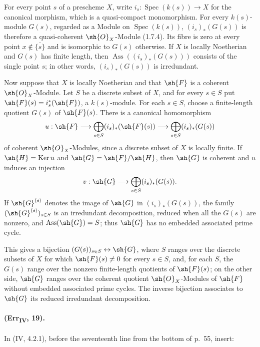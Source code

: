 \begin{remark}[3.2.9]
For every point $s$ of a prescheme $X$, write
$i_s:\operatorname{Spec}(k(s))\to X$ for the canonical morphism, which
is a quasi-compact monomorphism.  For every $k(s)$-module $G(s)$,
regarded as a Module on $\operatorname{Spec}(k(s))$,
$(i_s)_*(G(s))$ is therefore a quasi-coherent $\sh{O}_X$-Module
(1.7.4).  Its fibre is zero at every point
$x\notin\overline{\{s\}}$ and is isomorphic to $G(s)$ otherwise.  If
$X$ is locally Noetherian and $G(s)$ has finite length, then
$\operatorname{Ass}((i_s)_*(G(s)))$ consists of the single point $s$;
in other words, $(i_s)_*(G(s))$ is irredundant.

Now suppose that $X$ is locally Noetherian and that $\sh{F}$ is a
coherent $\sh{O}_X$-Module.  Let $S$ be a discrete subset of $X$, and
for every $s\in S$ put $\sh{F}(s)=i_s^*(\sh{F})$, a $k(s)$-module.
For each $s\in S$, choose a finite-length quotient $G(s)$ of
$\sh{F}(s)$.  There is a canonical homomorphism
\[
 u:\sh{F}\longrightarrow
 \bigoplus_{s\in S}(i_s)_*(\sh{F}(s))\longrightarrow
 \bigoplus_{s\in S}(i_s)_*(G(s))
\]
of coherent $\sh{O}_X$-Modules, since a discrete subset of $X$ is
locally finite.  If $\sh{H}=\operatorname{Ker}u$ and
$\sh{G}=\sh{F}/\sh{H}$, then $\sh{G}$ is coherent and $u$ induces an
injection
\[
 v:\sh{G}\longrightarrow\bigoplus_{s\in S}(i_s)_*(G(s)).
\]
If $\sh{G}^{(s)}$ denotes the image of $\sh{G}$ in
$(i_s)_*(G(s))$, the family $(\sh{G}^{(s)})_{s\in S}$ is an
irredundant decomposition, reduced when all the $G(s)$ are nonzero, and
$\operatorname{Ass}(\sh{G})=S$; thus $\sh{G}$ has no embedded
associated prime cycle.

This gives a bijection $(G(s))_{s\in S}\leftrightarrow\sh{G}$, where
$S$ ranges over the discrete subsets of $X$ for which
$\sh{F}(s)\neq0$ for every $s\in S$, and, for each $S$, the $G(s)$
range over the nonzero finite-length quotients of $\sh{F}(s)$; on the
other side, $\sh{G}$ ranges over the coherent quotient
$\sh{O}_X$-Modules of $\sh{F}$ without embedded associated prime
cycles.  The inverse bijection associates to $\sh{G}$ its reduced
irredundant decomposition.
\end{remark}

\paragraph{(Err\textsubscript{IV}, 19).}
In (IV, 4.2.1), before the seventeenth line from the bottom of p.~55,
insert:

